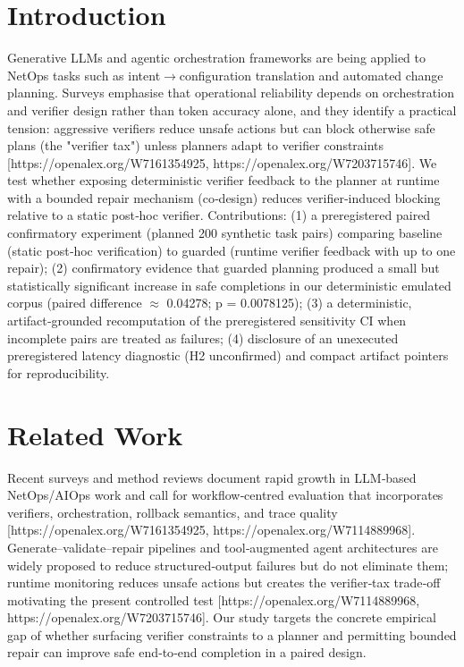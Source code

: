 \documentclass[conference]{IEEEtran}
\begin{document}
\section{Introduction}
Generative LLMs and agentic orchestration frameworks are being applied to NetOps tasks such as intent\ensuremath{\rightarrow}configuration translation and automated change planning. Surveys emphasise that operational reliability depends on orchestration and verifier design rather than token accuracy alone, and they identify a practical tension: aggressive verifiers reduce unsafe actions but can block otherwise safe plans (the "verifier tax") unless planners adapt to verifier constraints [https://openalex.org/W7161354925, https://openalex.org/W7203715746]. We test whether exposing deterministic verifier feedback to the planner at runtime with a bounded repair mechanism (co‑design) reduces verifier‑induced blocking relative to a static post‑hoc verifier. Contributions: (1) a preregistered paired confirmatory experiment (planned 200 synthetic task pairs) comparing baseline (static post‑hoc verification) to guarded (runtime verifier feedback with up to one repair); (2) confirmatory evidence that guarded planning produced a small but statistically significant increase in safe completions in our deterministic emulated corpus (paired difference \ensuremath{\approx} 0.04278; p = 0.0078125); (3) a deterministic, artifact‑grounded recomputation of the preregistered sensitivity CI when incomplete pairs are treated as failures; (4) disclosure of an unexecuted preregistered latency diagnostic (H2 unconfirmed) and compact artifact pointers for reproducibility.

\section{Related Work}
Recent surveys and method reviews document rapid growth in LLM‑based NetOps/AIOps work and call for workflow‑centred evaluation that incorporates verifiers, orchestration, rollback semantics, and trace quality [https://openalex.org/W7161354925, https://openalex.org/W7114889968]. Generate--validate--repair pipelines and tool‑augmented agent architectures are widely proposed to reduce structured‑output failures but do not eliminate them; runtime monitoring reduces unsafe actions but creates the verifier‑tax trade‑off motivating the present controlled test [https://openalex.org/W7114889968, https://openalex.org/W7203715746]. Our study targets the concrete empirical gap of whether surfacing verifier constraints to a planner and permitting bounded repair can improve safe end‑to‑end completion in a paired design.
\end{document}
